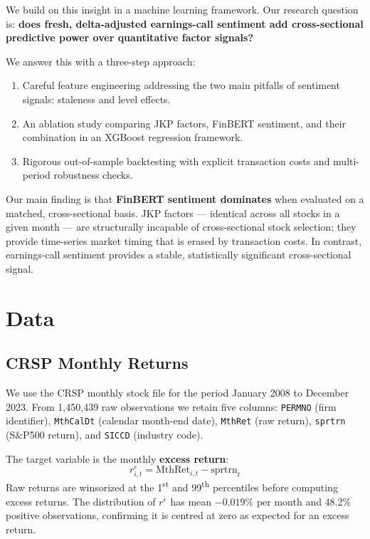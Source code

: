 \documentclass[11pt, a4paper]{article}
\begin{document}
We build on this insight in a machine learning framework.
Our research question is: \textbf{does fresh, delta-adjusted earnings-call sentiment
add cross-sectional predictive power over quantitative factor signals?}

We answer this with a three-step approach:
\begin{enumerate}[noitemsep]
    \item Careful feature engineering addressing the two main pitfalls
          of sentiment signals: staleness and level effects.
    \item An ablation study comparing JKP factors, FinBERT sentiment,
          and their combination in an XGBoost regression framework.
    \item Rigorous out-of-sample backtesting with explicit transaction costs
          and multi-period robustness checks.
\end{enumerate}

Our main finding is that \textbf{FinBERT sentiment dominates} when evaluated
on a matched, cross-sectional basis. JKP factors --- identical across all stocks in
a given month --- are structurally incapable of cross-sectional stock selection;
they provide time-series market timing that is erased by transaction costs.
In contrast, earnings-call sentiment provides a stable, statistically significant
cross-sectional signal.

\section{Data}

\subsection{CRSP Monthly Returns}

We use the CRSP monthly stock file for the period January 2008 to December 2023.
From 1,450,439 raw observations we retain five columns:
\texttt{PERMNO} (firm identifier), \texttt{MthCalDt} (calendar month-end date),
\texttt{MthRet} (raw return), \texttt{sprtrn} (S\&P500 return), and \texttt{SICCD}
(industry code).

The target variable is the monthly \textbf{excess return}:
\[
    r^e_{i,t} = \text{MthRet}_{i,t} - \text{sprtrn}_t
\]
Raw returns are winsorized at the 1\textsuperscript{st} and 99\textsuperscript{th}
percentiles before computing excess returns.
The distribution of $r^e$ has mean $-0.019\%$ per month and 48.2\% positive
observations, confirming it is centred at zero as expected for an excess return.
\end{document}
